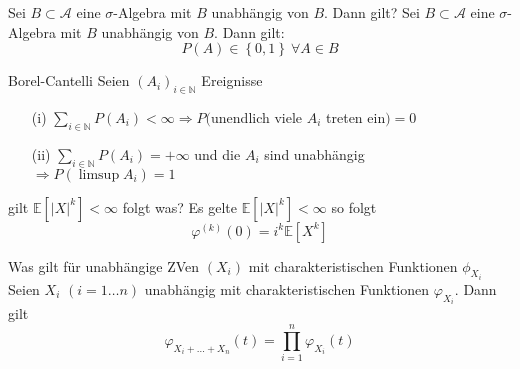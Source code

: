 \documentclass[avery5371,grid,frame]{flashcards} %
\newcommand{\1}{ \mathbb{1} } %
\begin{document}
\begin{flashcard}[Lemma]{  Sei $B\subset\mathcal{A}$ eine $\sigma$-Algebra mit $B$ unabhängig von $B$. Dann gilt?}
  Sei $B\subset\mathcal{A}$ eine $\sigma$-Algebra mit $B$ unabhängig
  von $B$. Dann gilt:
  \[
  P\left(A\right)\in\left\{ 0,1\right\} \ \forall A\in B
  \]
\end{flashcard}

\begin{flashcard}[Lemma]{Borel-Cantelli}
  Seien $\left(A_{i}\right)_{i\in\mathbb{N}}$ Ereignisse
  \begin{itemize}
  \item [{(i)}] $\sum_{i\in\mathbb{N}}P\left(A_{i}\right)<\infty\Rightarrow$$P($unendlich
    viele $A_{i}$ treten ein$)=0$
  \item [{(ii)}] $\sum_{i\in\mathbb{N}}P\left(A_{i}\right)=+\infty$ und
    die $A_{i}$ sind unabhängig $\Rightarrow P\left(\limsup A_{i}\right)=1$
  \end{itemize}
\end{flashcard}

\begin{flashcard}[Lemma]{gilt $\mathbb{E}\left[\left|X\right|^{k}\right]<\infty$ folgt was?}
  Es gelte $\mathbb{E}\left[\left|X\right|^{k}\right]<\infty$ so folgt
  \[
  \varphi^{\left(k\right)}\left(0\right)=i^{k}\mathbb{E}\left[X^{k}\right]
  \]

\end{flashcard}

\begin{flashcard}[Lemma]{Was gilt für unabhängige ZVen $(X_i)$ mit charakteristischen Funktionen $\phi_{X_i}$}
  Seien $X_{i}$ $\left(i=1\ldots n\right)$ unabhängig mit charakteristischen
  Funktionen $\varphi_{X_{i}}$. Dann gilt
  \[
  \varphi_{X_{i}+\ldots+X_{n}}\left(t\right)=\prod_{i=1}^{n}\varphi_{X_{i}}\left(t\right)
  \]

\end{flashcard}
\end{document}
